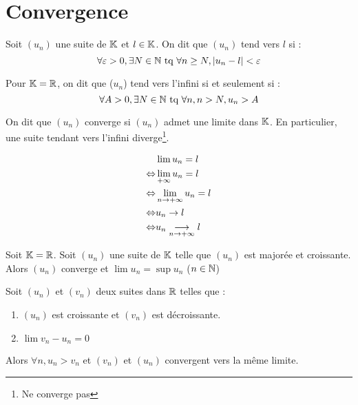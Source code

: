 \section{Convergence}
\begin{defi}
Soit $(u_n)$ une suite de $\mathbb{K}$ et $l\in\mathbb{K}$. On dit que $(u_n)$ tend vers $l$ si :
$$\forall\varepsilon>0,\exists N\in\mathbb{N}\text{~tq~}\forall n\geq N, |u_n-l| < \varepsilon$$
\end{defi}
\begin{defi}
Pour $\mathbb{K}=\mathbb{R}$, on dit que ($u_n$) tend vers l'infini si et seulement si :
$$\forall A>0,\exists N\in\mathbb{N}\text{~tq~}\forall n,n>N, u_n>A$$
\end{defi}
\begin{defi}
On dit que $(u_n)$ converge si $(u_n)$ admet une limite dans $\mathbb{K}$. En particulier, une suite tendant vers l'infini diverge\footnote{Ne converge pas}.
\end{defi}

\begin{nota}
\begin{align*}
  &\lim u_n = l\\
\Leftrightarrow& \lim\limits_{+\infty}u_n=l\\
\Leftrightarrow& \lim\limits_{n\to+\infty}u_n = l\\
\Leftrightarrow& u_n \rightarrow l\\
\Leftrightarrow& u_n \underset{n\to+\infty}{\longrightarrow}l
\end{align*}
\end{nota}

\begin{thm}
Soit $\mathbb{K}=\mathbb{R}$. Soit $(u_n)$ une suite de $\mathbb{K}$ telle que $(u_n)$ est majorée et croissante. Alors $(u_n)$ converge et $\lim u_n = \sup u_n$ ($n\in\mathbb{N}$)
\end{thm}

\begin{appl}
Soit $(u_n)$ et $(v_n)$ deux suites dans $\mathbb{R}$ telles que :
\begin{enumerate}
	\item $(u_n)$ est croissante et $(v_n)$ est décroissante.
	\item $\lim v_n-u_n = 0$
\end{enumerate}
Alors $\forall n, u_n >v_n$ et $(v_n)$ et $(u_n)$ convergent vers la même limite.
\end{appl}
